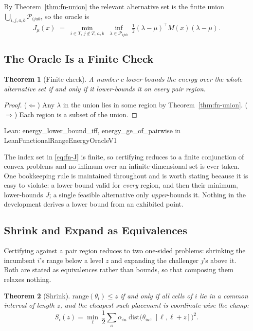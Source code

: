 \documentclass[conference]{IEEEtran}
\newtheorem{theorem}{Theorem}
\theoremstyle{definition}
\newcommand{\lean}[1]{\textsf{\footnotesize #1}}
\newcommand{\leanbox}[1]{%
  \par\vspace{2pt}\noindent
  {\footnotesize\textsf{Lean: #1}}\par\vspace{2pt}}
\begin{document}
By Theorem~\ref{thm:fn-union} the relevant alternative set is the finite union
$\bigcup_{i,j,a,b}\mathcal{P}_{ijab}$, so the oracle is
\begin{equation}
J_\mu(x)\;=\;\min_{i\in T,\,j\notin T,\,a,b}\;
\inf_{\lambda\in\mathcal{P}_{ijab}}\;
\tfrac{1}{2}(\lambda-\mu)^{\top}M(x)(\lambda-\mu).
\label{eq:fn-J}
\end{equation}

\subsection{The Oracle Is a Finite Check}
\label{sec:fn-oracle}

\begin{theorem}[Finite check]
\label{thm:fn-oracle}
A number $c$ lower-bounds the energy over the whole alternative set if and only if it
lower-bounds it on every pair region.
\end{theorem}

\begin{proof}
($\Leftarrow$) Any $\lambda$ in the union lies in some region by Theorem~\ref{thm:fn-union}.
($\Rightarrow$) Each region is a subset of the union.
\end{proof}

\leanbox{\lean{energy\_lower\_bound\_iff}, \lean{energy\_ge\_of\_pairwise} in
\lean{LeanFunctionalRangeEnergyOracleV1}}

The index set in \eqref{eq:fn-J} is finite, so certifying reduces to a finite conjunction of
convex problems and no infimum over an infinite-dimensional set is ever taken. One
bookkeeping rule is maintained throughout and is worth stating because it is easy to violate:
a lower bound valid for \emph{every} region, and then their minimum, lower-bounds $J$; a
single feasible alternative only \emph{upper}-bounds it. Nothing in the development derives a
lower bound from an exhibited point.

\subsection{Shrink and Expand as Equivalences}
\label{sec:fn-shrink}

Certifying against a pair region reduces to two one-sided problems: shrinking the incumbent
$i$'s range below a level $z$ and expanding the challenger $j$'s above it. Both are stated as
equivalences rather than bounds, so that composing them relaxes nothing.

\begin{theorem}[Shrink]
\label{thm:fn-shrink}
$\mathrm{range}(\theta_{i})\le z$ if and only if all cells of $i$ lie in a common interval of
length $z$, and the cheapest such placement is coordinate-wise the clamp:
\begin{equation}
S_{i}(z)=\min_{\ell}\,\frac{1}{2}\sum_{a}\alpha_{ia}\;
\mathrm{dist}\bigl(\theta_{ia},\,[\ell,\ell+z]\bigr)^{2}.
\label{eq:fn-shrink}
\end{equation}
\end{theorem}
\end{document}
